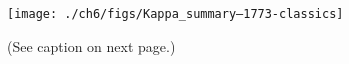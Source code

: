   \begin{figure}
    \centering
    \noindent\texttt{[image: ./ch6/figs/Kappa\_summary--1773-classics]}
    \caption[Inverted V precipitation and best-fit Maxwellian and kappa
    distribution parameters (Orbit 1773)]{(See caption on next page.)}
    \label{ch6:Fig1}
  \end{figure}
